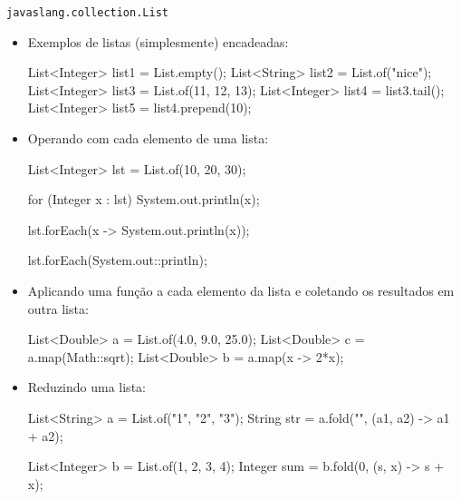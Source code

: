 \documentclass[smaller]{beamer}
\begin{document}
\begin{frame}{\texttt{javaslang.collection.List}}
  \begin{itemize}
    \item Exemplos de listas (simplesmente) encadeadas:
\begin{pygmented}[]
List<Integer> list1 = List.empty();
List<String>  list2 = List.of("nice");
List<Integer> list3 = List.of(11, 12, 13);
List<Integer> list4 = list3.tail();
List<Integer> list5 = list4.prepend(10);
\end{pygmented}
    \begin{center}
    \end{center}

    \framebreak
    
    \item Operando com cada elemento de uma lista:
\begin{pygmented}[]
List<Integer> lst = List.of(10, 20, 30);

for (Integer x : lst)
  System.out.println(x);

lst.forEach(x -> System.out.println(x));

lst.forEach(System.out::println);
\end{pygmented}

    \framebreak
    
    \item Aplicando uma função a cada elemento da lista e coletando os
    resultados em outra lista:
\begin{pygmented}[]
List<Double> a = List.of(4.0, 9.0, 25.0);
List<Double> c = a.map(Math::sqrt);
List<Double> b = a.map(x -> 2*x);
\end{pygmented}

    \framebreak
    
    \item Reduzindo uma lista:
\begin{pygmented}[]
List<String> a = List.of("1", "2", "3");
String str = a.fold("", (a1, a2) -> a1 + a2);

List<Integer> b = List.of(1, 2, 3, 4);
Integer sum = b.fold(0, (s, x) -> s + x);
\end{pygmented}

  \end{itemize}
\end{frame}
\end{document}
